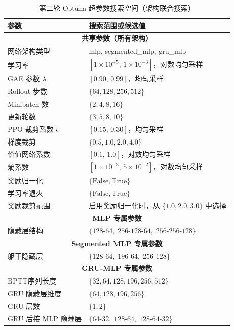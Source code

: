 \documentclass[12pt, a4paper, UTF8]{ctexart}
\numberwithin{equation}{section}
\begin{document}
\begin{table}[htbp]
  \centering
  \caption{ 第二轮 Optuna 超参数搜索空间（架构联合搜索）}
  \label{tab:appendix_optuna_round2_space}
  \begin{tabularx}{\textwidth}{lX}
    \toprule
    参数 & 搜索范围或候选值 \\
    \midrule
    \multicolumn{2}{c}{\textbf{共享参数（所有架构）}} \\
    \midrule
    网络架构类型 & mlp, segmented\_mlp, gru\_mlp \\
    学习率 & $[1\times10^{-5},\,1\times10^{-3}]$，对数均匀采样 \\
    GAE 参数 $\lambda$ & $[0.90,\,0.99]$，均匀采样 \\
    Rollout 步数 & $\{64, 128, 256, 512\}$ \\
    Minibatch 数 & $\{2, 4, 8, 16\}$ \\
    更新轮数 & $\{3, 5, 8, 10\}$ \\
    PPO 裁剪系数 $\epsilon$ & $[0.15,\,0.30]$，均匀采样 \\
    梯度裁剪 & $\{0.5, 1.0, 2.0, 4.0\}$ \\
    价值网络系数 & $[0.1,\,1.0]$，对数均匀采样 \\
    熵系数 & $[1\times10^{-3},\,5\times10^{-2}]$，对数均匀采样 \\
    奖励归一化 & $\{\text{False}, \text{True}\}$ \\
    学习率退火 & $\{\text{False}, \text{True}\}$ \\
    奖励裁剪范围 & 启用奖励归一化时，从 $\{1.0, 2.0, 3.0\}$ 中选择 \\
    \midrule
    \multicolumn{2}{c}{\textbf{MLP 专属参数}} \\
    \midrule
    隐藏层结构 & $\{128\text{-}64,\;256\text{-}128\text{-}64,\;256\text{-}256\text{-}128\}$ \\
    \midrule
    \multicolumn{2}{c}{\textbf{Segmented MLP 专属参数}} \\
    \midrule
    躯干隐藏层 & $\{128\text{-}64,\;196\text{-}64,\;256\text{-}128\}$ \\
    \midrule
    \multicolumn{2}{c}{\textbf{GRU-MLP 专属参数}} \\
    \midrule
    BPTT序列长度 & $\{32, 64, 128, 196, 256, 512\}$ \\
    GRU 隐藏层维度 & $\{64, 128, 196, 256\}$ \\
    GRU 层数 & $\{1, 2\}$ \\
    GRU 后接 MLP 隐藏层 & $\{64\text{-}32,\;128\text{-}64,\;128\text{-}64\text{-}32\}$ \\
    \bottomrule
  \end{tabularx}
  \begin{minipage}{\linewidth}\raggedright
  \end{minipage}
\end{table}
\end{document}
